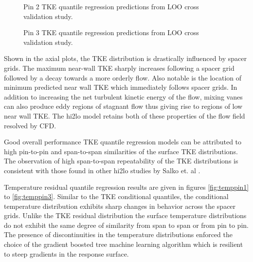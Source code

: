 \begin{figure}[H]%
    \centering
    \qquad
    \caption[Q-Q LOO TKE pin 2 results.]{Pin 2 TKE quantile regression predictions from LOO cross validation study.}%
    \label{fig:tkepin2}%
\end{figure}

\begin{figure}[H]%
    \centering
    \qquad
    \caption[Q-Q LOO TKE pin 3 results.]{Pin 3 TKE quantile regression predictions from LOO cross validation study.}%
    \label{fig:tkepin3}%
\end{figure}

Shown in the axial plots, the TKE distribution is drastically influenced by spacer grids.  The maximum near-wall TKE sharply increases following a spacer grid followed by a decay towards a more orderly flow.  Also notable is the location of minimum predicted near wall TKE which immediately follows spacer grids.  In addition to increasing the net turbulent kinetic energy of the flow, mixing vanes can also produce eddy regions of stagnant flow thus giving rise to regions of low near wall TKE.  The hi2lo model retains both of these properties of the flow field resolved by CFD.    

Good overall performance TKE quantile regression models can be attributed to high pin-to-pin and span-to-span similarities of the surface TKE distributions. The observation of high span-to-span repeatability of the TKE distributions is consistent with those found in other hi2lo studies by Salko et. al \cite{salko17}.

Temperature residual quantile regression results are given in figures \ref{fig:temppin1} to \ref{fig:temppin3}.  Similar to the TKE conditional quantiles, the conditional temperature distribution exhibits sharp changes in behavior across the spacer grids. Unlike the TKE residual distribution the surface temperature distributions do not exhibit the same degree of similarity from span to span or from pin to pin.  The presence of discontinuities in the temperature distributions enforced the choice of the gradient boosted tree machine learning algorithm which is resilient to steep gradients in the response surface.

